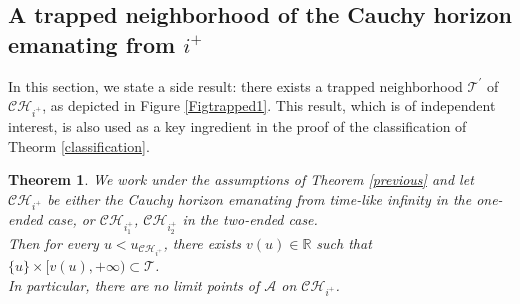 \documentclass[10pt,a4paper]{article}
\theoremstyle{plain}
\newtheorem{thm}{Theorem}[section]
\theoremstyle{remark}
\theoremstyle{definition}
\newcommand{\RR}{\mathbb{R}}
\theoremstyle{plain}
\theoremstyle{remark}
\theoremstyle{definition}
\newcommand{\CH}{\mathcal{CH}_{i^+}}
\newcommand{\CHone}{\mathcal{CH}_{i^+_1}}
\newcommand{\CHtwo}{\mathcal{CH}_{i^+_2}}
\numberwithin{equation}{section}
\begin{document}
\subsection{A trapped neighborhood of the Cauchy horizon emanating from $i^+$}
In this section, we state a side result: there exists a trapped neighborhood $\mathcal{T}^{'}$ of $\CH$, as depicted in Figure \ref{Figtrapped1}. This result, which is of independent interest, is also used as a key ingredient in the proof of the classification of Theorm \ref{classification}.
\begin{thm} \label{trappedtheorem} We work under the assumptions of Theorem \ref{previous} and let $\CH$ be either the Cauchy horizon emanating from time-like infinity in the one-ended case, or $\CHone$, $\CHtwo$ in the two-ended case. \\Then for every $u<u_{\CH}$, there exists $v(u) \in \RR$ such that $\{u\} \times [v(u),+\infty) \subset \mathcal{T}$. \\ In particular, there are no limit points of $\mathcal{A}$ on $\CH$.
	
	
	
\end{thm}
\end{document}
